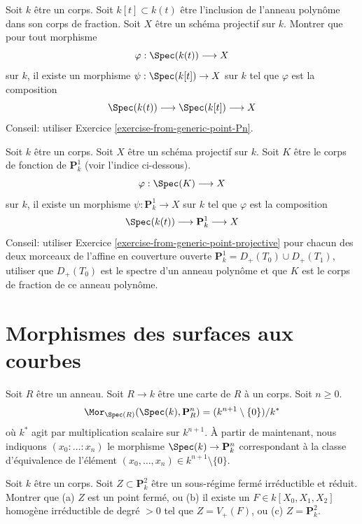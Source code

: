 \begin{exercise}
\label{exercise-from-generic-point-projective}
Soit $k$ être un corps. Soit $k[t] \subset k(t)$
être l'inclusion de l'anneau polynôme dans son corps de fraction. Soit
$X$ être un schéma projectif sur $k$.
Montrer que pour tout morphisme
$$
\varphi : \Spec(k(t)) \longrightarrow X
$$
sur $k$, il existe un morphisme $\psi : \Spec(k[t]) \to X$
sur $k$ tel que $\varphi$ est la composition
$$
\Spec(k(t)) \longrightarrow \Spec(k[t]) \longrightarrow X
$$
Conseil: utiliser Exercice \ref{exercise-from-generic-point-Pn}.
\end{exercise}

\begin{exercise}
\label{exercise-from-generic-point-P1-to-projective}
Soit $k$ être un corps. Soit $X$ être un schéma
projectif sur $k$. Soit $K$ être le corps de fonction de
$\mathbf{P}^1_k$ (voir l'indice ci-dessous).
$$
\varphi : \Spec(K) \longrightarrow X
$$
sur $k$, il existe un morphisme $\psi : \mathbf{P}^1_k \to X$
sur $k$ tel que $\varphi$ est la composition
$$
\Spec(k(t)) \longrightarrow \mathbf{P}^1_k \longrightarrow X
$$
Conseil: utiliser Exercice \ref{exercise-from-generic-point-projective} pour chacun des deux morceaux
de l'affine en couverture ouverte $\mathbf{P}^1_k = D_+(T_0)
\cup D_+(T_1)$, utiliser que $D_+(T_0)$ est le spectre
d'un anneau polynôme et que $K$ est le
corps de fraction de ce anneau polynôme.
\end{exercise}







\section{Morphismes des surfaces aux courbes}
\label{section-from-surfaces-to-curves}

\begin{exercise}
\label{exercise-points-projective-space}
Soit $R$ être un
anneau. Soit $R \to k$ être une carte de $R$ à
un corps. Soit $n
\geq 0$.
$$
\Mor_{\Spec(R)}(\Spec(k), \mathbf{P}^n_R)
=
(k^{n + 1} \setminus \{0\})/k^*
$$
où $k^*$ agit par multiplication scalaire sur $k^{n + 1}$.
À partir de maintenant, nous indiquons $(x_0 :
\ldots : x_n)$ le morphisme $\Spec(k) \to \mathbf{P}^n_k$ correspondant
à la classe d'équivalence de l'élément
$(x_0, \ldots, x_n) \in k^{n + 1} \setminus \{0\}$.
\end{exercise}

\begin{exercise}
\label{exercise-curve-projective-plane}
Soit $k$ être un corps. Soit $Z \subset \mathbf{P}^2_k$
être un sous-régime fermé irréductible et
réduit. Montrer que (a) $Z$ est un point fermé, ou
(b) il existe un $F \in k[X_0, X_1, X_2]$ homogène
irréductible de degré $> 0$ tel que $Z =
V_{+}(F)$, ou (c) $Z = \mathbf{P}^2_k$.
\end{exercise}


